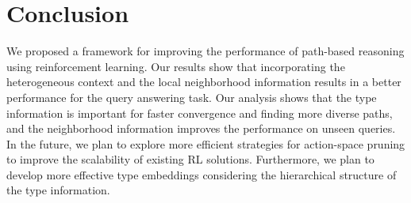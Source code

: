 
\section{Conclusion}
\label{sec:conclusion}
We proposed a framework for improving the performance of path-based reasoning using reinforcement learning. Our results show that incorporating the heterogeneous context and the local neighborhood information results in a better performance for the query answering task. Our analysis shows that the type information is important for faster convergence and finding more diverse paths, and the neighborhood information improves the performance on unseen queries. In the future, we plan to explore more efficient strategies for action-space pruning to improve the scalability of existing RL solutions. Furthermore, we plan to develop more effective type embeddings considering the hierarchical structure of the type information. 

